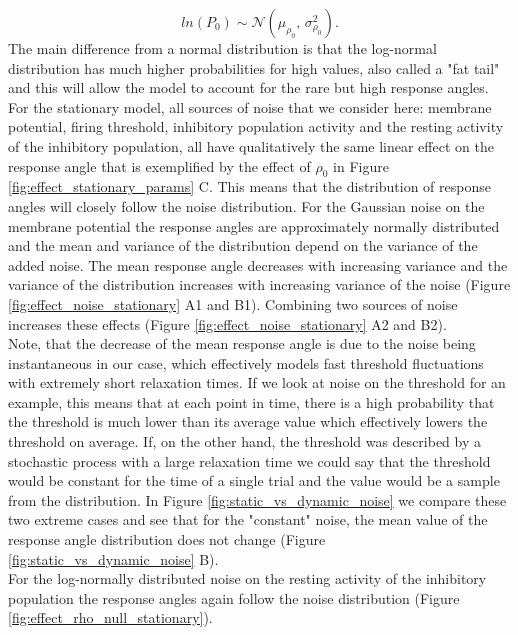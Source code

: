     \begin{equation}
	 ln(P_{0}) \sim \mathcal{N}(\mu_{\rho_{0}},\,\sigma_{\rho_{0}}^{2}).
	\label{eq:rho_null}
	\end{equation}
    The main difference from a normal distribution is that the log-normal distribution has much higher probabilities for high values, also called a "fat tail" and this will allow the model to account for the rare but high response angles.\\
    For the stationary model, all sources of noise that we consider here: membrane potential, firing threshold, inhibitory population activity and the resting activity of the inhibitory population, all have qualitatively the same linear effect on the response angle that is exemplified by the effect of $\rho_0$ in Figure \ref{fig:effect_stationary_params} C.
    This means that the distribution of response angles will closely follow the noise distribution.
    For the Gaussian noise on the membrane potential the response angles are approximately normally distributed and the mean and variance of the distribution depend on the variance of the added noise.
    The mean response angle decreases with increasing variance and the variance of the distribution increases with increasing variance of the noise (Figure \ref{fig:effect_noise_stationary} A1 and B1).
    Combining two sources of noise increases these effects (Figure \ref{fig:effect_noise_stationary} A2 and B2).\\
    Note, that the decrease of the mean response angle is due to the noise being instantaneous in our case, which effectively models fast threshold fluctuations with extremely short relaxation times.
    If we look at noise on the threshold for an example, this means that at each point in time, there is a high probability that the threshold is much lower than its average value which effectively lowers the threshold on average.
    If, on the other hand, the threshold was described by a stochastic process with a large relaxation time we could say that the threshold would be constant for the time of a single trial and the value would be a sample from the distribution.
    In Figure \ref{fig:static_vs_dynamic_noise} we compare these two extreme cases and see that for the "constant" noise, the mean value of the response angle distribution does not change (Figure \ref{fig:static_vs_dynamic_noise} B).\\
    For the log-normally distributed noise on the resting activity of the inhibitory population the response angles again follow the noise distribution (Figure \ref{fig:effect_rho_null_stationary}).
